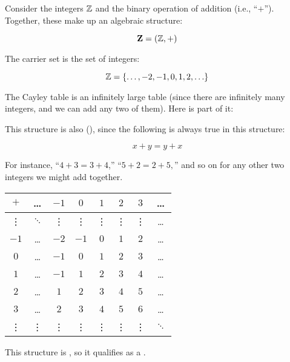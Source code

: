 \documentclass[../../../main.tex]{subfiles}
\begin{document}
\begin{fexample}

Consider the integers $\Ints/$ and the binary operation of addition (i.e., ``$+$''). Together, these make up an algebraic structure:

\begin{equation*}
  \algebra{Z} = (\Ints/, +)
\end{equation*} 

The carrier set is the set of integers:

\begin{equation*}
  \Ints/ = \{ \ldots, -2, -1, 0, 1, 2, \ldots \}
\end{equation*}

The Cayley table is an infinitely large table (since there are infinitely many integers, and we can add any two of them). Here is part of it:

\begin{aside}
  \begin{remark}
    This structure is also  (), since the following is always true in this structure:
    
    \begin{equation*}
      x + y = y + x
    \end{equation*}
    
    For instance, ``$4 + 3 = 3 + 4$,'' ``$5 + 2 = 2 + 5,$'' and so on for any other two integers we might add together.
  \end{remark}
\end{aside}

\begin{center}
  \begin{tabular}{| c || c | c | c | c | c | c | c |}
    \hline
    $+$    & \ldots   & $-1$   & $0$    & $1$    & $2$    & $3$    & \ldots
    \\ \hline \hline
    \vdots & $\ddots$ & \vdots & \vdots & \vdots & \vdots & \vdots & \ldots
    \\ \hline
    $-1$   & \ldots   & $-2$   & $-1$   & $0$    & $1$    & $2$    & \ldots
    \\ \hline
    $0$    & \ldots   & $-1$   & $0$    & $1$    & $2$    & $3$    & \ldots
    \\ \hline
    $1$    & \ldots   & $-1$   & $1$    & $2$    & $3$    & $4$    & \ldots
    \\ \hline
    $2$    & \ldots   & $1$    & $2$    & $3$    & $4$    & $5$    & \ldots
    \\ \hline
    $3$    & \ldots   & $2$    & $3$    & $4$    & $5$    & $6$    & \ldots
    \\ \hline
    \vdots & \vdots   & \vdots & \vdots & \vdots & \vdots & \vdots & $\ddots$
    \\ \hline
  \end{tabular}
\end{center}

This structure is , so it qualifies as a .

\end{fexample}
\end{document}

